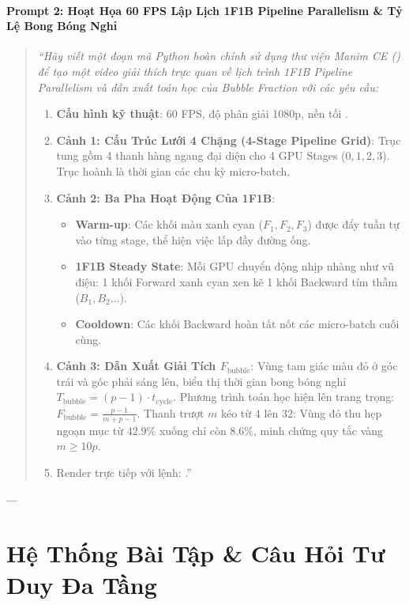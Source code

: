 \begin{simulationbox}
\paragraph{Prompt 2: Hoạt Họa 60 FPS Lập Lịch 1F1B Pipeline Parallelism \& Tỷ Lệ Bong Bóng Nghỉ}
\begin{quote}\small\itshape
``Hãy viết một đoạn mã Python hoàn chỉnh sử dụng thư viện Manim CE () để tạo một video giải thích trực quan về lịch trình 1F1B Pipeline Parallelism và dẫn xuất toán học của Bubble Fraction với các yêu cầu:
\begin{enumerate}
  \item \textbf{Cấu hình kỹ thuật}: 60 FPS, độ phân giải 1080p, nền tối .
  \item \textbf{Cảnh 1: Cấu Trúc Lưới 4 Chặng (4-Stage Pipeline Grid)}: Trục tung gồm 4 thanh hàng ngang đại diện cho 4 GPU Stages ($0, 1, 2, 3$). Trục hoành là thời gian các chu kỳ micro-batch.
  \item \textbf{Cảnh 2: Ba Pha Hoạt Động Của 1F1B}:
    \begin{itemize}
      \item \textbf{Warm-up}: Các khối màu xanh cyan ($F_1, F_2, F_3$) được đẩy tuần tự vào từng stage, thể hiện việc lấp đầy đường ống.
      \item \textbf{1F1B Steady State}: Mỗi GPU chuyển động nhịp nhàng như vũ điệu: 1 khối Forward xanh cyan xen kẽ 1 khối Backward tím thẫm ($B_1, B_2\dots$).
      \item \textbf{Cooldown}: Các khối Backward hoàn tất nốt các micro-batch cuối cùng.
    \end{itemize}
  \item \textbf{Cảnh 3: Dẫn Xuất Giải Tích $F_{\text{bubble}}$}: Vùng tam giác màu đỏ ở góc trái và góc phải sáng lên, biểu thị thời gian bong bóng nghỉ $T_{\text{bubble}} = (p-1) \cdot t_{\text{cycle}}$. Phương trình toán học hiện lên trang trọng: $F_{\text{bubble}} = \frac{p-1}{m+p-1}$. Thanh trượt $m$ kéo từ $4$ lên $32$: Vùng đỏ thu hẹp ngoạn mục từ $42.9\%$ xuống chỉ còn $8.6\%$, minh chứng quy tắc vàng $m \ge 10p$.
  \item Render trực tiếp với lệnh: .''
\end{enumerate}
\end{quote}
\end{simulationbox}

---

\section{Hệ Thống Bài Tập \& Câu Hỏi Tư Duy Đa Tầng}
\label{sec:ch10-exercises}

